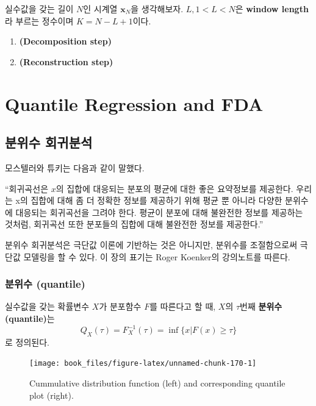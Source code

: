 \documentclass[b5paper,]{book}
\theoremstyle{definition}
\theoremstyle{definition}
\theoremstyle{definition}
\theoremstyle{remark}
\let\BeginKnitrBlock\begin \let\EndKnitrBlock\end
\begin{document}
실수값을 갖는 길이 \(N\)인 시계열 \(\mathbf{x}_{N}\)을 생각해보자.
\(L, 1<L<N\)은 \textbf{window length}라 부르는 정수이며 \(K=N-L+1\)이다.

\begin{enumerate}
\def\labelenumi{\arabic{enumi}.}
\item
  \textbf{(Decomposition step)}
\item
  \textbf{(Reconstruction step)}
\end{enumerate}

\part{Quantile Regression and
FDA}\label{part-quantile-regression-and-fda}

\chapter{분위수 회귀분석}\label{qr}

모스텔러와 튜키는 다음과 같이 말했다.

``회귀곡선은 \(x\)의 집합에 대응되는 분포의 평균에 대한 좋은 요약정보를
제공한다. 우리는 x의 집합에 대해 좀 더 정확한 정보를 제공하기 위해 평균
뿐 아니라 다양한 분위수에 대응되는 회귀곡선을 그려야 한다. 평균이 분포에
대해 불완전한 정보를 제공하는 것처럼, 회귀곡선 또한 분포들의 집합에 대해
불완전한 정보를 제공한다.''

분위수 회귀분석은 극단값 이론에 기반하는 것은 아니지만, 분위수를
조절함으로써 극단값 모델링을 할 수 있다. 이 장의 표기는 Roger Koenker의
강의노트를 따른다.

\section{분위수 (quantile)}\label{-quantile}

\BeginKnitrBlock{definition}[분위수]
\protect\hypertarget{def:unnamed-chunk-169}{}{\label{def:unnamed-chunk-169}
{} }실수값을 갖는 확률변수 \(X\)가 분포함수 \(F\)를
따른다고 할 때, \(X\)의 \(\tau\)번째 \textbf{분위수(quantile)}는
\[Q_{X}(\tau)=F_{X}^{-1}(\tau)=\inf\{x|F(x)\geq \tau\}\] 로 정의된다.
\EndKnitrBlock{definition}

\begin{figure}

{\centering \texttt{[image: book\_files/figure-latex/unnamed-chunk-170-1]} 

}

\caption{Cummulative distribution function (left) and corresponding quantile plot (right).}\label{fig:unnamed-chunk-170}
\end{figure}
\end{document}
